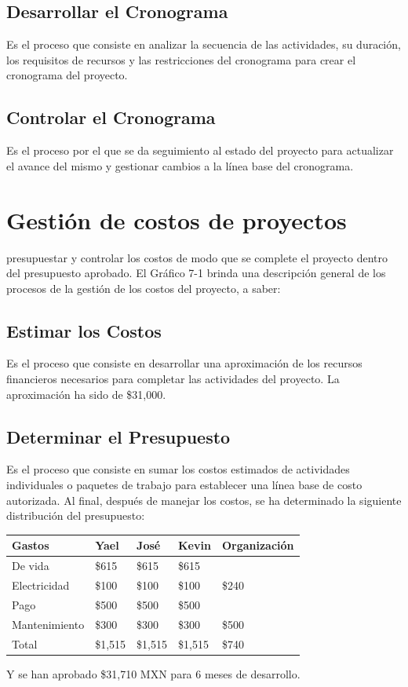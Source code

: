 \documentclass[]{article}
\begin{document}
\subsection{Desarrollar el Cronograma}
Es el proceso que consiste en analizar la secuencia de
las actividades, su duraci\'on, los requisitos de recursos y las restricciones del
cronograma para crear el cronograma del proyecto.

\subsection{Controlar el Cronograma}
Es el proceso por el que se da seguimiento al estado del
proyecto para actualizar el avance del mismo y gestionar cambios a la l\'inea base del
cronograma.
\section{Gesti\'on de costos de proyectos}
presupuestar y controlar los costos de modo que se complete el proyecto dentro del presupuesto
aprobado. El Gr\'afico 7-1 brinda una descripci\'on general de los procesos de la gesti\'on de los
costos del proyecto, a saber:
\subsection{Estimar los Costos}
Es el proceso que consiste en desarrollar una aproximaci\'on de los recursos financieros necesarios para completar las actividades del proyecto.
La aproximaci\'on ha sido de \$31,000.
\subsection{Determinar el Presupuesto}
Es el proceso que consiste en sumar los costos estimados de actividades individuales o paquetes de trabajo para establecer una l\'inea base de costo autorizada.
Al final, despu\'es de manejar los costos, se ha determinado la siguiente distribuci\'on del presupuesto:
\begin{table}[H]
	\begin{tabular}{|l|l|l|l|l|}
		\hline
		Gastos        & Yael    & José    & Kevin   & Organización \\ \hline
		De vida       & \$615   & \$615   & \$615   &              \\ \hline
		Electricidad  & \$100   & \$100   & \$100   & \$240        \\ \hline
		Pago          & \$500   & \$500   & \$500   &              \\ \hline
		Mantenimiento & \$300   & \$300   & \$300   & \$500        \\ \hline
		Total         & \$1,515 & \$1,515 & \$1,515 & \$740        \\ \hline
	\end{tabular}
\end{table}
Y se han aprobado \$31,710 MXN para 6 meses de desarrollo.
\newpage


\end{document}
